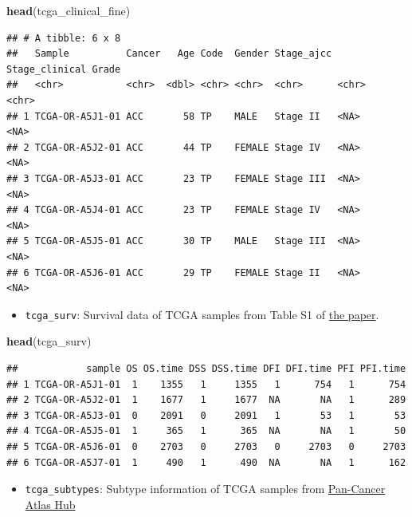 \documentclass[
]{book}
\newenvironment{Shaded}{\begin{snugshade}}{\end{snugshade}}
\newcommand{\FunctionTok}[1]{\textcolor[rgb]{0.13,0.29,0.53}{\textbf{#1}}}
\newcommand{\NormalTok}[1]{#1}
\providecommand{\tightlist}{%
  \setlength{\itemsep}{0pt}\setlength{\parskip}{0pt}}
\begin{document}
\begin{Shaded}
\begin{Highlighting}[]
\FunctionTok{head}\NormalTok{(tcga\_clinical\_fine)}
\end{Highlighting}
\end{Shaded}

\begin{verbatim}
## # A tibble: 6 x 8
##   Sample          Cancer   Age Code  Gender Stage_ajcc Stage_clinical Grade
##   <chr>           <chr>  <dbl> <chr> <chr>  <chr>      <chr>          <chr>
## 1 TCGA-OR-A5J1-01 ACC       58 TP    MALE   Stage II   <NA>           <NA> 
## 2 TCGA-OR-A5J2-01 ACC       44 TP    FEMALE Stage IV   <NA>           <NA> 
## 3 TCGA-OR-A5J3-01 ACC       23 TP    FEMALE Stage III  <NA>           <NA> 
## 4 TCGA-OR-A5J4-01 ACC       23 TP    FEMALE Stage IV   <NA>           <NA> 
## 5 TCGA-OR-A5J5-01 ACC       30 TP    MALE   Stage III  <NA>           <NA> 
## 6 TCGA-OR-A5J6-01 ACC       29 TP    FEMALE Stage II   <NA>           <NA>
\end{verbatim}

\begin{itemize}
\tightlist
\item
  \texttt{tcga\_surv}: Survival data of TCGA samples from Table S1 of \href{https://www.cell.com/cell/fulltext/S0092-8674(18)30229-0?_returnURL=https\%3A\%2F\%2Flinkinghub.elsevier.com\%2Fretrieve\%2Fpii\%2FS0092867418302290\%3Fshowall\%3Dtrue\#supplementaryMaterial}{the paper}.
\end{itemize}

\begin{Shaded}
\begin{Highlighting}[]
\FunctionTok{head}\NormalTok{(tcga\_surv)}
\end{Highlighting}
\end{Shaded}

\begin{verbatim}
##            sample OS OS.time DSS DSS.time DFI DFI.time PFI PFI.time
## 1 TCGA-OR-A5J1-01  1    1355   1     1355   1      754   1      754
## 2 TCGA-OR-A5J2-01  1    1677   1     1677  NA       NA   1      289
## 3 TCGA-OR-A5J3-01  0    2091   0     2091   1       53   1       53
## 4 TCGA-OR-A5J5-01  1     365   1      365  NA       NA   1       50
## 5 TCGA-OR-A5J6-01  0    2703   0     2703   0     2703   0     2703
## 6 TCGA-OR-A5J7-01  1     490   1      490  NA       NA   1      162
\end{verbatim}

\begin{itemize}
\tightlist
\item
  \texttt{tcga\_subtypes}: Subtype information of TCGA samples from \href{https://xenabrowser.net/datapages/?host=https\%3A\%2F\%2Fpancanatlas.xenahubs.net&removeHub=https\%3A\%2F\%2Fxena.treehouse.gi.ucsc.edu\%3A443}{Pan-Cancer Atlas Hub}
\end{itemize}
\end{document}
